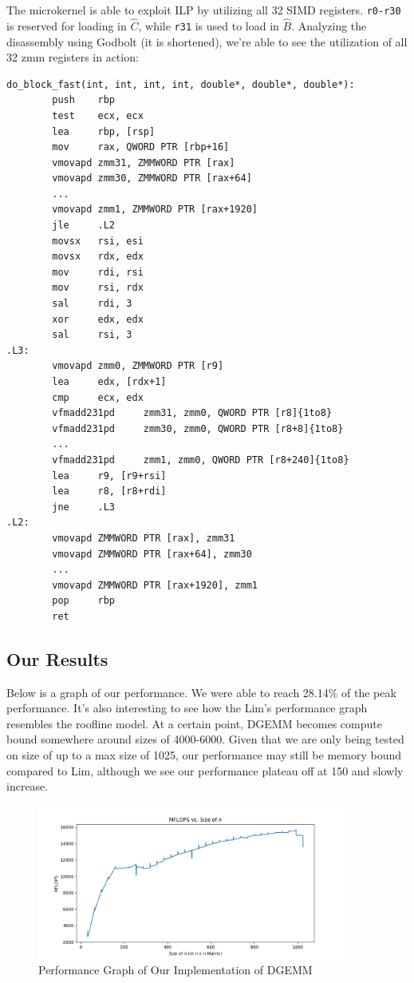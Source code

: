 \documentclass{article}
\begin{document}
The microkernel is able to exploit ILP by utilizing all 32 SIMD registers. \verb|r0-r30| is reserved for loading in $\hat{C}$, while \verb|r31| is used to load in $\hat{B}$. Analyzing the disassembly using Godbolt (it is shortened), we're able to see the utilization of all 32 zmm registers in action:
\begin{verbatim}
do_block_fast(int, int, int, int, double*, double*, double*):
        push    rbp
        test    ecx, ecx
        lea     rbp, [rsp]
        mov     rax, QWORD PTR [rbp+16]
        vmovapd zmm31, ZMMWORD PTR [rax]
        vmovapd zmm30, ZMMWORD PTR [rax+64]
        ...
        vmovapd zmm1, ZMMWORD PTR [rax+1920]
        jle     .L2
        movsx   rsi, esi
        movsx   rdx, edx
        mov     rdi, rsi
        mov     rsi, rdx
        sal     rdi, 3
        xor     edx, edx
        sal     rsi, 3
.L3:
        vmovapd zmm0, ZMMWORD PTR [r9]
        lea     edx, [rdx+1]
        cmp     ecx, edx
        vfmadd231pd     zmm31, zmm0, QWORD PTR [r8]{1to8}
        vfmadd231pd     zmm30, zmm0, QWORD PTR [r8+8]{1to8}
        ...
        vfmadd231pd     zmm1, zmm0, QWORD PTR [r8+240]{1to8}
        lea     r9, [r9+rsi]
        lea     r8, [r8+rdi]
        jne     .L3
.L2:
        vmovapd ZMMWORD PTR [rax], zmm31
        vmovapd ZMMWORD PTR [rax+64], zmm30
        ...
        vmovapd ZMMWORD PTR [rax+1920], zmm1
        pop     rbp
        ret
\end{verbatim}

\subsection{Our Results}
Below is a graph of our performance. We were able to reach 28.14\% of the peak performance. It's also interesting to see how the Lim's performance graph resembles the roofline model. At a certain point, DGEMM becomes compute bound somewhere around sizes of 4000-6000. Given that we are only being tested on size of up to a max size of 1025, our performance may still be memory bound compared to Lim, although we see our performance plateau off at 150 and slowly increase. 
\begin{figure}
  \centerline{\includegraphics[width=4in]{figures/MFLOPS.png}}
  \caption{Performance Graph of Our Implementation of DGEMM}
\end{figure}
\end{document}
